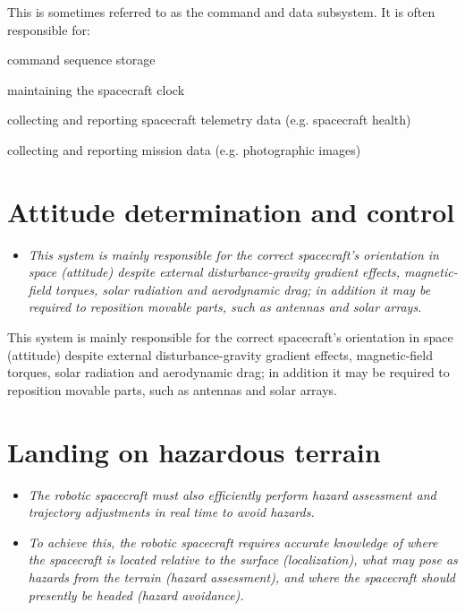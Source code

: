 This is sometimes referred to as the command and data subsystem. It is
often responsible for:

command sequence storage

maintaining the spacecraft clock

collecting and reporting spacecraft telemetry data (e.g. spacecraft
health)

collecting and reporting mission data (e.g. photographic images)

\section{Attitude determination and
control}\label{attitude-determination-and-control}

\begin{itemize}
\item
  \emph{This system is mainly responsible for the correct spacecraft's
  orientation in space (attitude) despite external disturbance-gravity
  gradient effects, magnetic-field torques, solar radiation and
  aerodynamic drag; in addition it may be required to reposition movable
  parts, such as antennas and solar arrays.}
\end{itemize}

This system is mainly responsible for the correct spacecraft's
orientation in space (attitude) despite external disturbance-gravity
gradient effects, magnetic-field torques, solar radiation and
aerodynamic drag; in addition it may be required to reposition movable
parts, such as antennas and solar arrays.

\section{Landing on hazardous
terrain}\label{landing-on-hazardous-terrain}

\begin{itemize}
\item
  \emph{The robotic spacecraft must also efficiently perform hazard
  assessment and trajectory adjustments in real time to avoid hazards.}
\item
  \emph{To achieve this, the robotic spacecraft requires accurate
  knowledge of where the spacecraft is located relative to the surface
  (localization), what may pose as hazards from the terrain (hazard
  assessment), and where the spacecraft should presently be headed
  (hazard avoidance).}
\end{itemize}

